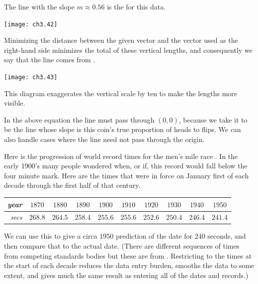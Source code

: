 The line with the slope \( m\approx 0.56 \)
is the %
for this data.
\begin{center}  \small
  \texttt{[image: ch3.42]}
\end{center}
Minimizing the distance
between the given vector and the vector used as the right-hand side
minimizes the total of these vertical lengths,
and consequently
we say that the line comes from
.
\begin{center}  \small
  \texttt{[image: ch3.43]}
\end{center}
This diagram exaggerates the vertical scale by ten
to make the lengths more visible.

In the above equation the line 
must pass through \( (0,0) \),
because we take it to be
the line whose slope is this coin's true proportion
of heads to flips. 
We can also handle cases where the line need not
pass through the origin.

Here is
the progression of world record times for the men's mile race \cite{Oakley}.
In the early 1900's many people wondered when, or if, 
this record would fall below the four minute mark.
Here are the times that were in force on January first
of each decade through the first half of that century.
\begin{center} \small
  \begin{tabular}{r|ccccccccc}
    \textit{year} &$1870$ &$1880$ &$1890$  &$1900$  
        &$1910$  &$1920$  &$1930$ &$1940$ &$1950$   \\
    \hline
    \textit{secs}  &$268.8$  &$264.5$  &$258.4$  &$255.6$  
        &$255.6$  &$252.6$  &$250.4$ &$246.4$ &$241.4$
  \end{tabular}  
\end{center}
We can use this to give a circa 1950 prediction of the date for $240$ seconds, 
and then compare that to the actual date.
(There are different sequences of times from competing standards
bodies but these are from \cite{WikipediaMensMile}.
Restricting to the times at the start of 
each decade reduces the data entry burden, smooths the data to some extent, 
and gives much the same result as entering all of the dates and records.)

